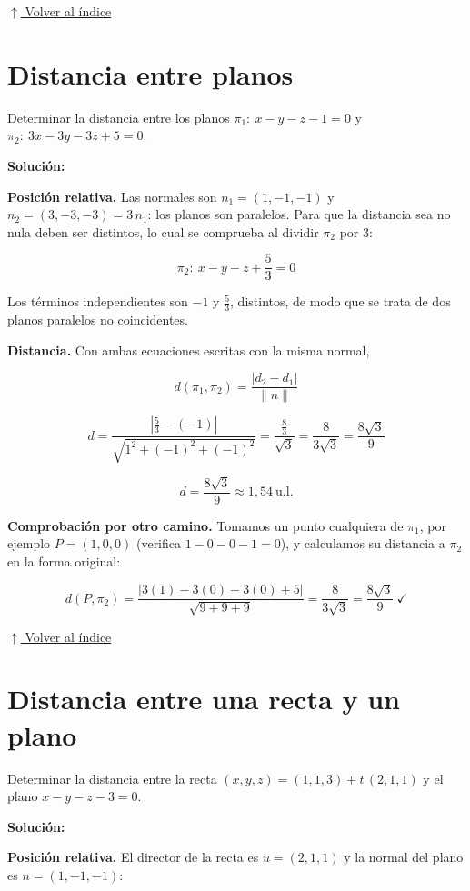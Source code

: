 \documentclass[12pt]{article}
\newcommand{\solucion}{%
    \vspace{0.8em}%
    \textbf{Solución:}%
    \vspace{0.8em}%
}
\newcommand{\volverindice}{%
    \vspace{1em}%
    \begin{flushright}%
        \hyperlink{indice}{\small $\uparrow$ Volver al índice}%
    \end{flushright}%
}
\begin{document}
\volverindice
\newpage


\section{Distancia entre planos}

Determinar la distancia entre los planos
$\pi_1:\ x-y-z-1=0$ y $\pi_2:\ 3x-3y-3z+5=0$.

\solucion

\textbf{Posición relativa.} Las normales son $n_1=(1,-1,-1)$ y
$n_2=(3,-3,-3)=3\,n_1$: los planos son paralelos. Para que la distancia sea
no nula deben ser distintos, lo cual se comprueba al dividir $\pi_2$ por
$3$:

\[
\pi_2:\ x-y-z+\frac{5}{3}=0
\]

Los términos independientes son $-1$ y $\tfrac{5}{3}$, distintos, de modo
que se trata de dos planos paralelos no coincidentes.

\textbf{Distancia.} Con ambas ecuaciones escritas con la misma normal,

\[
d(\pi_1,\pi_2)=\frac{|d_2-d_1|}{\|n\|}
\]

\[
d=\frac{\left|\tfrac{5}{3}-(-1)\right|}{\sqrt{1^2+(-1)^2+(-1)^2}}
=\frac{\tfrac{8}{3}}{\sqrt{3}}=\frac{8}{3\sqrt{3}}=\frac{8\sqrt{3}}{9}
\]

\[
\boxed{d=\frac{8\sqrt{3}}{9}\approx1{,}54\ \text{u.l.}}
\]

\textbf{Comprobación por otro camino.} Tomamos un punto cualquiera de
$\pi_1$, por ejemplo $P=(1,0,0)$ (verifica $1-0-0-1=0$), y calculamos su
distancia a $\pi_2$ en la forma original:

\[
d(P,\pi_2)=\frac{|3(1)-3(0)-3(0)+5|}{\sqrt{9+9+9}}
=\frac{8}{3\sqrt{3}}=\frac{8\sqrt{3}}{9}\ \checkmark
\]

\volverindice
\newpage


\section{Distancia entre una recta y un plano}

Determinar la distancia entre la recta $(x,y,z)=(1,1,3)+t\,(2,1,1)$ y el
plano $x-y-z-3=0$.

\solucion

\textbf{Posición relativa.} El director de la recta es $u=(2,1,1)$ y la
normal del plano es $n=(1,-1,-1)$:
\end{document}
